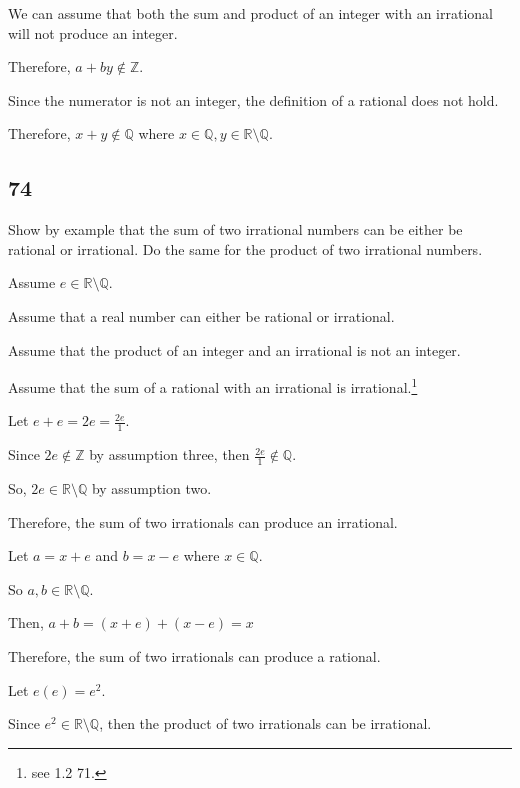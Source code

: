 \documentclass{article}
\begin{document}
We can assume that both the sum and product of an integer with an irrational will not produce an integer.

Therefore, $a + by \notin \mathbb{Z}$.

Since the numerator is not an integer, the definition of a rational does not hold. 

Therefore, $x + y \notin \mathbb{Q}$ where $x \in \mathbb{Q}, y \in \mathbb{R} \setminus \mathbb{Q}$.



\subsection*{74}
Show by example that the sum of two irrational numbers can be either be rational or irrational. 
Do the same for the product of two irrational numbers.

Assume $e \in \mathbb{R} \setminus \mathbb{Q}$.

Assume that a real number can either be rational or irrational.

Assume that the product of an integer and an irrational is not an integer.

Assume that the sum of a rational with an irrational is irrational.\footnote{see 1.2 71.}

\vspace{12pt}

Let $e + e = 2e = \frac{2e}{1}$.

Since $2e \notin \mathbb{Z}$ by assumption three, then $\frac{2e}{1} \notin \mathbb{Q}$.

So, $2e \in \mathbb{R} \setminus \mathbb{Q}$ by assumption two.

Therefore, the sum of two irrationals can produce an irrational.

\vspace{12pt}

Let $a = x + e$ and $b = x - e$ where $x \in \mathbb{Q}$.

So $a, b \in \mathbb{R} \setminus \mathbb{Q}$.

Then, $a + b = (x + e) + (x - e) = x$

Therefore, the sum of two irrationals can produce a rational.

\vspace{12pt}

Let $e(e) = e^2$.

Since $e^2 \in \mathbb{R} \setminus \mathbb{Q}$, then the product of two irrationals can be irrational.
\end{document}
